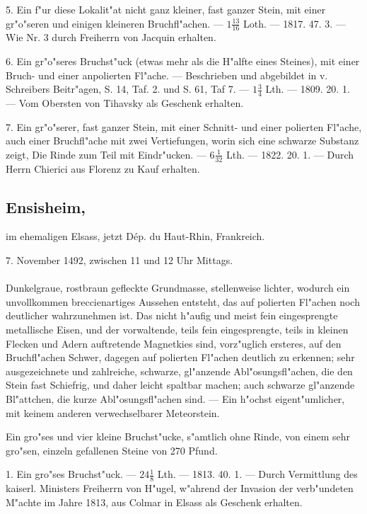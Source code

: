 \documentclass[a4paper, 11pt, oneside, polutonikogreek, german]{article}
\begin{document}
5. Ein f"ur diese Lokalit"at nicht ganz kleiner, fast ganzer Stein, mit einer gr"o"seren und einigen kleineren Bruchfl"achen. --- $1\frac{13}{16}$ Loth. --- 1817. 47. 3. --- Wie Nr. 3 durch Freiherrn von Jacquin erhalten.

6. Ein gr"o"seres Bruchst"uck (etwas mehr als die H"alfte eines Steines), mit einer Bruch- und einer anpolierten Fl"ache. --- Beschrieben und abgebildet in v. Schreibers Beitr"agen, S. 14, Taf. 2. und S. 61, Taf 7. --- $1\frac{3}{4}$ Lth. --- 1809. 20. 1. --- Vom Obersten von Tihavsky als Geschenk erhalten.

7. Ein gr"o"serer, fast ganzer Stein, mit einer Schnitt- und einer polierten Fl"ache, auch einer Bruchfl"ache mit zwei Vertiefungen, worin sich eine schwarze Substanz zeigt, Die Rinde zum Teil mit Eindr"ucken. --- $6\frac{1}{32}$ Lth. --- 1822. 20. 1. --- Durch Herrn Chierici aus Florenz zu Kauf erhalten.
\subsection[Ensisheim.]{Ensisheim,}
\begin{center}
\small
im ehemaligen Elsass, jetzt Dép. du Haut-Rhin, Frankreich.

7. November 1492, zwischen 11 und 12 Uhr Mittags.
\end{center}
\paragraph{}
Dunkelgraue, rostbraun gefleckte Grundmasse, stellenweise lichter, wodurch ein unvollkommen breccienartiges Aussehen entsteht, das auf polierten Fl"achen noch deutlicher wahrzunehmen ist. Das nicht h"aufig und meist fein eingesprengte metallische Eisen, und der vorwaltende, teils fein eingesprengte, teils in kleinen Flecken und Adern auftretende Magnetkies sind, vorz"uglich ersteres, auf den Bruchfl"achen Schwer, dagegen auf polierten Fl"achen deutlich zu erkennen; sehr ausgezeichnete und zahlreiche, schwarze, gl"anzende Abl"osungsfl"achen, die den Stein fast Schiefrig, und daher leicht spaltbar machen; auch schwarze gl"anzende Bl"attchen‚ die kurze Abl"osungsfl"achen sind. --- Ein h"ochst eigent"umlicher, mit keinem anderen verwechselbarer Meteorstein.

Ein gro"ses und vier kleine Bruchst"ucke, s"amtlich ohne Rinde, von einem sehr gro"sen, einzeln gefallenen Steine von 270 Pfund.

1. Ein gro"ses Bruchst"uck. --- $24\frac{1}{8}$ Lth. --- 1813. 40. 1. --- Durch Vermittlung des kaiserl. Ministers Freiherrn von H"ugel, w"ahrend der Invasion der verb"undeten M"achte im Jahre 1813, aus Colmar in Elsass als Geschenk erhalten.
\end{document}
